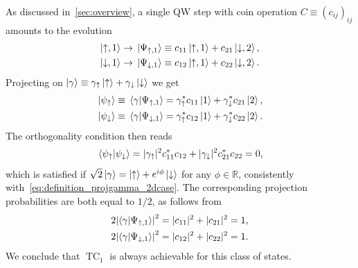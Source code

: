 \documentclass[
	aps, pra,
	superscriptaddress, twocolumn,
	floatfix,
	10pt
]{revtex4-1}
\newcommand{\on}[1]{\operatorname{#1}}
\newcommand{\parTitle}[1]{\noindent{\color{Mahogany}(\emph{#1})}}
\newcommand{\RR}{\mathbb{R}}
\newcommand{\calW}{{\mathcal{W}}}
\renewcommand{\parTitle}[1]{}
\begin{document}
\parTitle{Single step}
As discussed in~\cref{sec:overview}, a single QW step with coin operation  $C\equiv (c_{ij})_{ij}$ amounts to the evolution
\begin{equation}
\begin{aligned}
	\ket{\uparrow,1} &\rightarrow \ket*{\Psi_{\uparrow,1}} \equiv c_{11}\ket{\uparrow,1} + c_{21}\ket{\downarrow,2}, \\
	\ket{\downarrow,1} &\rightarrow \ket*{\Psi_{\downarrow,1}} \equiv c_{12}\ket{\uparrow,1} + c_{22}\ket{\downarrow,2}.
\end{aligned}
\end{equation}
Projecting on $\ket\gamma\equiv \gamma_\uparrow\ket\uparrow+\gamma_\downarrow\ket\downarrow$ we get
\begin{equation}
\begin{aligned}
	\ket*{\psi_\uparrow} \equiv  \braket*{\gamma}{\Psi_{\uparrow,1}} &= \gamma_\uparrow^*c_{11}\ket1 + \gamma_\downarrow^* c_{21}\ket2, \\
	\ket*{\psi_\downarrow} \equiv  \braket*{\gamma}{\Psi_{\downarrow,1}} &= \gamma_\uparrow^* c_{12} \ket1 + \gamma_\downarrow^* c_{22} \ket2.
\end{aligned}
\end{equation}
The orthogonality condition then reads
\begin{equation}
\begin{gathered}
	\braket*{\psi_\uparrow}{\psi_\downarrow}
	= |\gamma_\uparrow|^2 c_{11}^* c_{12} + |\gamma_\downarrow|^2 c_{21}^* c_{22} = 0,
\end{gathered}
\end{equation}
which is satisfied if $\sqrt2\ket\gamma = \ket\uparrow + e^{i\phi}\ket\downarrow$ for any $\phi\in\RR$, consistently with~\cref{eq:definition_projgamma_2dcase}.
The corresponding projection probabilities are both equal to $1/2$, as follows from
\begin{equation}
\begin{aligned}
	2\abs{\braket{\gamma}{\Psi_{\uparrow,1}}}^2 &= |c_{11}|^2 + |c_{21}|^2 = 1, \\
	2\abs{\braket{\gamma}{\Psi_{\downarrow,1}}}^2 &= |c_{12}|^2 + |c_{22}|^2 = 1.
\end{aligned}
\end{equation}
We conclude that $\on{TC}_1$ is always achievable for this class of states.
\end{document}
